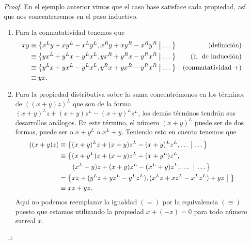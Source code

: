     \begin{proof}
        En el ejemplo anterior vimos que el caso base satisface cada propiedad, as\'i que nos concentraremos en el paso inductivo.

        \begin{enumerate}
            \item Para la conmutatividad tenemos que 
            \begin{align*}
                xy & \equiv \left\{x^Ly+xy^L-x^Ly^L, x^Ry+xy^R-x^Ry^R\;\middle|\; \dots\right\} &\text{(definici\'on)} \\
                & \equiv \left\{yx^L+y^Lx-y^Lx^L, yx^R+y^Rx-y^Rx^R\;\middle|\; \dots\right\} &\text{(h. de inducci\'on)} \\
                & \equiv \left\{y^Lx+yx^L-y^Lx^L, y^Rx+yx^R-y^Rx^R\;\middle|\; \dots\right\} &\text{(conmutatividad +)} \\
                & \equiv yx.
            \end{align*}
            \item Para la propiedad distributiva sobre la suma concentr\'emonos en los t\'erminos de $((x+y)z)^L$ que son de la forma $(x+y)^Lz + (x+y)z^L - (x+y)^Lz^L$, los dem\'as t\'erminos tendr\'an sus desarrollos an\'alogos. En este t\'ermino, el n\'umero $(x+y)^L$ puede ser de dos formas, puede ser o $x+y^L$ o $x^L+y$. Teniendo esto en cuenta tenemos que 
            \begin{align*}
                ((x+y)z) & \equiv \left\{(x+y)^Lz + (x+y)z^L - (x+y)^Lz^L, \dots\;\middle|\; \dots\right\}\\
                & \equiv \big\{(x+y^L)z + (x+y)z^L - (x+y^L)z^L, \\
                & \quad\quad (x^L+y)z + (x+y)z^L - (x^L+y)z^L, \dots\;\big|\;\dots\big\} \\
                & = \left\{xz+(y^Lz + yz^L - y^Lz^L), (x^Lz + xz^L - x^Lz^L) + yz\;\middle|\; \right\}\\
                & \equiv xz + yz.
            \end{align*}
            Aqu\'i no podemos reemplazar la igualdad $(=)$ por la equivalencia $(\equiv)$ puesto que estamos utilizando la propiedad $x + (-x) = 0$ para todo n\'umero surreal $x$. 
            

\end{enumerate}
\end{proof}
